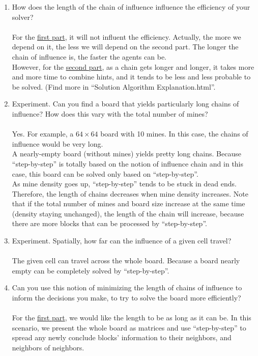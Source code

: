 \documentclass[letter]{article}
\begin{document}
\begin{enumerate}
	\item {How does the length of the chain of influence influence the efficiency of your solver?} \\
	\\
	For the \hyperref[firstpart]{first part}, it will not influent the efficiency. Actually, the more we depend on it, the less we will depend on the second part. The longer the chain of influence is, the faster the agents can be. \\
	However, for the \hyperref[secondpart]{second part}, as a chain gets longer and longer, it takes more and more time to combine hints, and it tends to be less and less probable to be solved. (Find more in “Solution Algorithm Explanation.html”.\\
	
	\item {Experiment. Can you find a board that yields particularly long chains of influence? How does this vary with the total number of mines?} \\
	\\
	Yes. For example, a $ 64 \times 64 $ board with 10 mines. In this case, the chains of influence would be very long. 
	\\
	A nearly-empty board (without mines) yields pretty long chains. Because “step-by-step” is totally based on the notion of influence chain and in this case, this board can be solved only based on “step-by-step”. 
	\\
	As mine density goes up, “step-by-step” tends to be stuck in dead ends. Therefore, the length of chains decreases when mine density increases. Note that if the total number of mines and board size increase at the same time (density staying unchanged), the length of the chain will increase, because there are more blocks that can be processed by “step-by-step”.
	\\
	\item {Experiment. Spatially, how far can the influence of a given cell travel?} \\
	\\
	The given cell can travel across the whole board. Because a board nearly empty can be completely solved by “step-by-step”.
	\\
	\item {Can you use this notion of minimizing the length of chains of influence to inform the decisions you make, to try to solve the board more efficiently?} \\
	\\
	For the \hyperref[firstpart]{first part}, we would like the length to be as long as it can be. In this scenario, we present the whole board as matrices and use “step-by-step” to spread any newly conclude blocks’ information to their neighbors, and neighbors of neighbors.

\end{enumerate}
\end{document}
